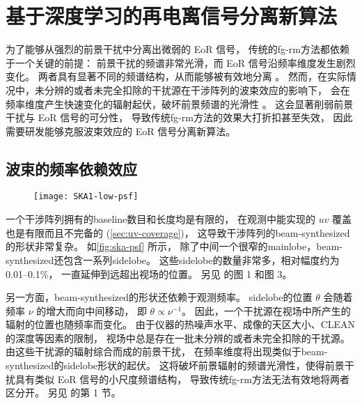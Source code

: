 
\chapter{基于深度学习的再电离信号分离新算法}
\label{chap:cdae}

为了能够从强烈的前景干扰中分离出微弱的 EoR 信号，
传统的\ac{fg-rm}方法都依赖于一个关键的前提：
前景干扰的频谱非常光滑，而 EoR 信号沿频率维度发生剧烈变化。
两者具有显著不同的频谱结构，从而能够被有效地分离 \cite{morales2010,chapman2016}。
然而，在实际情况中，未分辨的或者未完全扣除的干扰源在干涉阵列的波束效应的影响下，
会在频率维度产生快速变化的辐射起伏，破坏前景频谱的光滑性 \cite{liu2009ps}。
这会显著削弱前景干扰与 EoR 信号的可分性，
导致传统\ac{fg-rm}方法的效果大打折扣甚至失效，
因此需要研发能够克服波束效应的 EoR 信号分离新算法。


\section{波束的频率依赖效应}
\label{sec:beam-effect}

\begin{figure}[htp]
  \centering
  \texttt{[image: SKA1-low-psf]}
  \label{fig:ska-psf}
\end{figure}

一个干涉阵列拥有的\ac{baseline}数目和长度均是有限的，
在观测中能实现的 $uv$ 覆盖也是有限而且不完备的 (\autoref{sec:uv-coverage})，
这导致干涉阵列的\ac{beam-synthesized}的形状非常复杂。
如\autoref{fig:ska-psf} 所示，
除了中间一个很窄的\ac{mainlobe}，\ac{beam-synthesized}还包含一系列\ac{sidelobe}。
这些\ac{sidelobe}的数量非常多，相对幅度约为 \numrange{0.01}{0.1}\%，
一直延伸到远超出视场的位置。
另见  的图 1 和图 3。

另一方面，\ac{beam-synthesized}的形状还依赖于观测频率。
\ac{sidelobe}的位置 $\theta$ 会随着频率 $\nu$ 的增大而向中间移动，
即 $\theta \propto \nu^{-1}$。
因此，一个干扰源在视场中所产生的辐射的位置也随频率而变化。
由于仪器的热噪声水平、成像的天区大小、CLEAN 的深度等因素的限制，
视场中总是存在一批未分辨的或者未完全扣除的干扰源。
由这些干扰源的辐射综合而成的前景干扰，
在频率维度将出现类似于\ac{beam-synthesized}的\ac{sidelobe}形状的起伏。
这将破坏前景辐射的频谱光滑性，使得前景干扰具有类似 EoR 信号的小尺度频谱结构，
导致传统\ac{fg-rm}方法无法有效地将两者区分开。
另见  的第 1 节。


